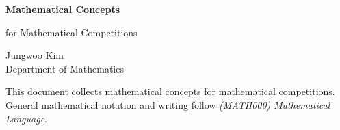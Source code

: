 \documentclass[11pt,oneside]{article}
\begin{document}
\thispagestyle{empty}

\begin{center}
    \vspace*{1.1cm}

    {\LARGE\bfseries Mathematical Concepts\par}

    \vspace{0.25cm}

    {\large for Mathematical Competitions\par}

    \vspace{0.75cm}

    {\normalsize
    Jungwoo Kim\\
    Department of Mathematics\\
    \PohangUniversityOfScienceAndTechnology
    \par}
\end{center}

\vspace{0.45cm}

This document collects mathematical concepts for mathematical competitions. General mathematical notation and writing follow \textit{(MATH000) Mathematical Language}.
\end{document}
